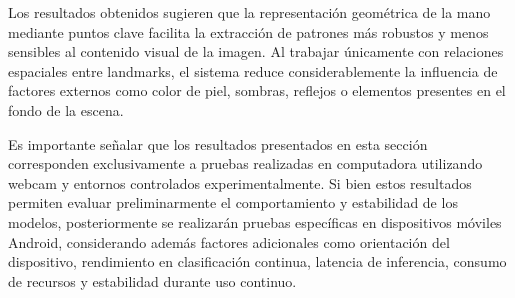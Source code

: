 	Los resultados obtenidos sugieren que la representación geométrica de la mano mediante puntos clave facilita la extracción de patrones más robustos y menos sensibles al contenido visual de la imagen. Al trabajar únicamente con relaciones espaciales entre landmarks, el sistema reduce considerablemente la influencia de factores externos como color de piel, sombras, reflejos o elementos presentes en el fondo de la escena.
	
	Es importante señalar que los resultados presentados en esta sección corresponden exclusivamente a pruebas realizadas en computadora utilizando webcam y entornos controlados experimentalmente. Si bien estos resultados permiten evaluar preliminarmente el comportamiento y estabilidad de los modelos, posteriormente se realizarán pruebas específicas en dispositivos móviles Android, considerando además factores adicionales como orientación del dispositivo, rendimiento en clasificación continua, latencia de inferencia, consumo de recursos y estabilidad durante uso continuo.
	
	
